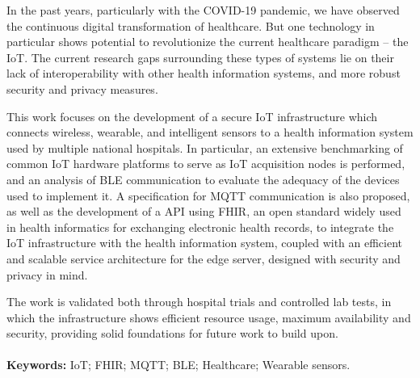 
\vspace{1cm}
\noindent

In the past years, particularly with the COVID-19 pandemic, we have observed the continuous digital transformation of healthcare. But one technology in particular shows potential to revolutionize the current healthcare paradigm -- the  \acf{IoT}.
The current research gaps surrounding these types of systems lie on their lack of interoperability with other health information systems, and more robust security and privacy measures.

This work focuses on the development of a secure \acs{IoT} infrastructure which connects wireless, wearable, and intelligent sensors to a health information system used by multiple national hospitals. 
In particular, an extensive benchmarking of common \acs{IoT} hardware platforms to serve as \acs{IoT} acquisition nodes is performed, and an analysis of \acf{BLE} communication to evaluate the adequacy of the devices used to implement it. 
A specification for \acf{MQTT} communication is also proposed, as well as the development of a \acf{API} using \acf{FHIR}, an open standard widely used in health informatics for exchanging electronic health records, to integrate the \acs{IoT} infrastructure with the health information system, coupled with an efficient and scalable service architecture for the edge server, designed with security and privacy in mind. 

The work is validated both through hospital trials and controlled lab tests, in which the infrastructure shows efficient resource usage, maximum availability and security, providing solid foundations for future work to build upon. 
\paragraph{}\textbf{Keywords:} \acl{IoT}; \acs{FHIR}; \acs{MQTT}; \acl{BLE}; Healthcare; Wearable sensors.
